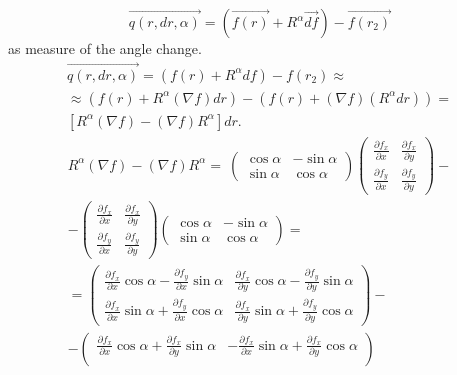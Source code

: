 \documentclass{article}
\newcommand{\vect}{\overrightarrow}
\begin{document}
$$\vect{q(r, dr, \alpha)} = \left(\vect{f(r)} + R^\alpha \vect{df}\right) - \vect{f(r_2)}$$ as measure of the angle change.
\begin{multline}
\label{formula:angle_change_vec}
  \vect{q(r, dr, \alpha)} = \left(f(r) + R^\alpha df\right) - f(r_2) \approx \\
  \approx (f(r) + R^\alpha (\nabla f) dr) - (f(r) + (\nabla f)(R^\alpha dr)) = \\ 
  \left[R^\alpha (\nabla f) - (\nabla f) R^\alpha \right] dr. 
\end{multline}
\begin{multline}
\label{formula:ugly_commutant}
  R^\alpha (\nabla f) - (\nabla f) R^\alpha =\
  \begin{pmatrix} 
    \cos \alpha & -\sin \alpha \\ 
    \sin \alpha & \cos \alpha 
  \end{pmatrix} 
  \begin{pmatrix} 
    \frac{\partial f_x}{\partial x} & \frac{\partial f_x}{\partial y} \\
    \frac{\partial f_y}{\partial x} & \frac{\partial f_y}{\partial y} 
  \end{pmatrix} - \\
  - \begin{pmatrix} 
    \frac{\partial f_x}{\partial x} & \frac{\partial f_x}{\partial y} \\
    \frac{\partial f_y}{\partial x} & \frac{\partial f_y}{\partial y} 
  \end{pmatrix}
  \begin{pmatrix} 
    \cos \alpha & -\sin \alpha \\
    \sin \alpha & \cos \alpha 
  \end{pmatrix} = \\
  = \begin{pmatrix}
    \frac{\partial f_x}{\partial x} \cos \alpha - \frac{\partial f_y}{\partial x} \sin \alpha &
    \frac{\partial f_x}{\partial y} \cos \alpha - \frac{\partial f_y}{\partial y} \sin \alpha \\
    \frac{\partial f_x}{\partial x} \sin \alpha + \frac{\partial f_y}{\partial x} \cos \alpha &
    \frac{\partial f_x}{\partial y} \sin \alpha + \frac{\partial f_y}{\partial y} \cos \alpha 
  \end{pmatrix} - \\
  - \begin{pmatrix} 
    \frac{\partial f_x}{\partial x} \cos \alpha + \frac{\partial f_x}{\partial y} \sin \alpha &
    - \frac{\partial f_x}{\partial x} \sin \alpha + \frac{\partial f_x}{\partial y} \cos \alpha \\

\end{pmatrix}
\end{multline}
\end{document}

